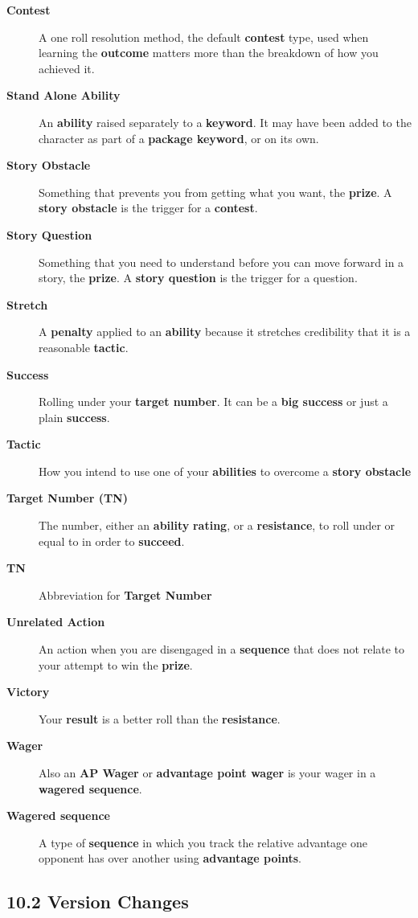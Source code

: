 \documentclass[
  11pt,
]{article}
\begin{document}
\begin{description}
\item[\textbf{Contest}]
A one roll resolution method, the default \textbf{contest} type, used
when learning the \textbf{outcome} matters more than the breakdown of
how you achieved it.
\item[\textbf{Stand Alone Ability}]
An \textbf{ability} raised separately to a \textbf{keyword}. It may have
been added to the character as part of a \textbf{package keyword}, or on
its own.
\item[\textbf{Story Obstacle}]
Something that prevents you from getting what you want, the
\textbf{prize}. A \textbf{story obstacle} is the trigger for a
\textbf{contest}.
\item[\textbf{Story Question}]
Something that you need to understand before you can move forward in a
story, the \textbf{prize}. A \textbf{story question} is the trigger for
a question.
\item[\textbf{Stretch}]
A \textbf{penalty} applied to an \textbf{ability} because it stretches
credibility that it is a reasonable \textbf{tactic}.
\item[\textbf{Success}]
Rolling under your \textbf{target number}. It can be a \textbf{big
success} or just a plain \textbf{success}.
\item[\textbf{Tactic}]
How you intend to use one of your \textbf{abilities} to overcome a
\textbf{story obstacle}
\item[\textbf{Target Number (TN)}]
The number, either an \textbf{ability} \textbf{rating}, or a
\textbf{resistance}, to roll under or equal to in order to
\textbf{succeed}.
\item[\textbf{TN}]
Abbreviation for \textbf{Target Number}
\item[\textbf{Unrelated Action}]
An action when you are disengaged in a \textbf{sequence} that does not
relate to your attempt to win the \textbf{prize}.
\item[\textbf{Victory}]
Your \textbf{result} is a better roll than the \textbf{resistance}.
\item[\textbf{Wager}]
Also an \textbf{AP Wager} or \textbf{advantage point wager} is your
wager in a \textbf{wagered sequence}.
\item[\textbf{Wagered sequence}]
A type of \textbf{sequence} in which you track the relative advantage
one opponent has over another using \textbf{advantage points}.
\end{description}

\hypertarget{version-changes}{%
\subsection{10.2 Version Changes}\label{version-changes}}
\end{document}
